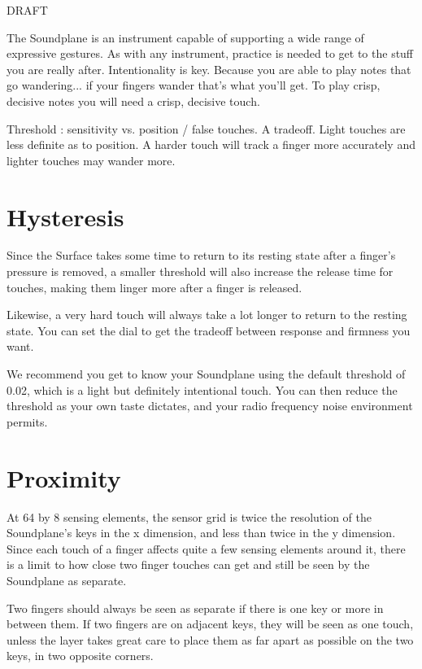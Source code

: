 DRAFT 

The Soundplane is an instrument capable of supporting a wide range of expressive gestures.  As with any instrument, practice is needed to get to the stuff you are really after.  Intentionality is key.  Because you are able to play notes that go wandering... if your fingers wander that’s what you’ll get.  To play crisp, decisive notes you will need a crisp, decisive touch.


Threshold : sensitivity vs. position / false touches.  A tradeoff.  Light touches are less definite as to position. A harder touch will track a finger more accurately and lighter touches may wander more.



\section{Hysteresis}

Since the Surface takes some time to return to its resting state after a finger’s pressure is removed, a smaller threshold will also increase the release time for touches, making them linger more after a finger is released. 

Likewise, a very hard touch will always take a lot longer to return to the resting state.  You can set the   dial to get the tradeoff between response and firmness you want. 

We recommend you get to know your Soundplane using the default threshold of 0.02, which is a light but definitely intentional touch.  You can then reduce the threshold as your own taste dictates, and your radio frequency noise environment permits.  

\section{Proximity}

At 64 by 8 sensing elements, the sensor grid is twice the resolution of the Soundplane’s keys in the x dimension, and less than twice in the y dimension.  Since each touch of a finger affects quite a few sensing elements around it, there is a limit to how close two finger touches can get and still be seen by the Soundplane as separate.  

Two fingers should always be seen as separate if there is one key or more in between them.  If two fingers are on adjacent keys, they will be seen as one touch, unless the layer takes great care to place them as far apart as possible on the two keys, in two opposite corners.  


